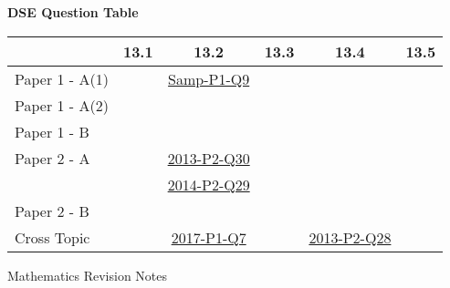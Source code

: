 \documentclass[12pt, a4paper]{article}
\begin{document}
\begin{absolutelynopagebreak}
\begin{center}
\textbf{DSE Question Table}
\end{center}
\begin{center}
\begin{tabular}{|l|c|c|c|c|c|}
\hline
        & 13.1 & 13.2 & 13.3 & 13.4 & 13.5 \\\hline
\hline
Paper 1 - A(1)&  & \hyperref[DSE2012S-CoreP1-Q09]{Samp-P1-Q9} &  &  &  \\
\hline
Paper 1 - A(2)&  &  &  &  &  \\
\hline
Paper 1 - B&  &  &  &  &  \\
\hline
\hline
Paper 2 - A&  & \hyperref[DSE2013-CoreP2-Q30]{2013-P2-Q30} &  &  &  \\
&  & \hyperref[DSE2014-CoreP2-Q29]{2014-P2-Q29} &  &  &  \\
\hline
Paper 2 - B&  &  &  &  &  \\
\hline
\hline
Cross Topic&  & \hyperref[DSE2017-CoreP1-Q07]{2017-P1-Q7} &  & \hyperref[DSE2013-CoreP2-Q28]{2013-P2-Q28} &  \\
\hline
\end{tabular}
\end{center}
\end{absolutelynopagebreak}
\newpage
\newpage
\thispagestyle{empty}
\begin{center}
Mathematics Revision Notes\\\vspace{1cm}
\greybox{\fontsize{24pt}{24pt}\selectfont {S2 Chapters}} \\\vspace{1cm}
\end{center}
\vspace{0.5cm}
\hline
\end{document}
